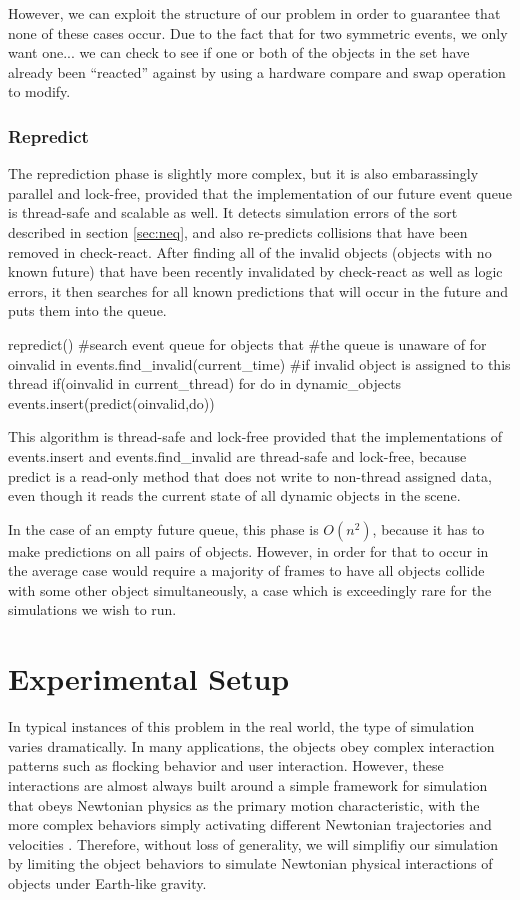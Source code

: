 \documentclass[conference]{IEEEtran}
\begin{document}
However, we can exploit the structure of our problem in order to guarantee that none of these cases occur.  Due to the fact that for two symmetric events, we only want one... we can check to see if one or both of the objects in the set have already been ``reacted'' against by using a hardware compare and swap operation to modify.

\subsubsection{Repredict}
The reprediction phase is slightly more complex, but it is also embarassingly parallel and lock-free, provided that the implementation of our future event queue is thread-safe and scalable as well.  It detects simulation errors of the sort described in section \ref{sec:neq}, and also re-predicts collisions
that have been removed in check-react.  After finding all of the invalid objects (objects with no known future) that have been recently invalidated by check-react as well as logic errors, it then
searches for all known predictions that will occur in the future and puts them into the queue.  
\begin{verbatimtab}[3]
repredict()
{
   #search event queue for objects that
   #the queue is unaware of
   for oinvalid in events.find_invalid(current_time)
   {
        #if invalid object is assigned to this thread
        if(oinvalid in current_thread)
        {
		for do in dynamic_objects
		{
			events.insert(predict(oinvalid,do))
		}
	}
   }
}
\end{verbatimtab}
This algorithm is thread-safe and lock-free provided that the implementations of events.insert and events.find\_invalid are thread-safe and lock-free, because predict is a read-only method that 
does not write to non-thread assigned data, even though it reads the current state of all dynamic objects in the scene.

In the case of an empty future queue, this phase is $O(n^2)$, because it has to make predictions on all pairs of objects.  However, in order for that to occur in the average case would require a majority of frames to have all objects collide
with some other object simultaneously, a case which is exceedingly rare for the simulations we wish to run.

\section{Experimental Setup}%

In typical instances of this problem in the real world, the type of simulation varies dramatically. In many applications, the objects obey complex interaction patterns such as flocking behavior and user interaction.  However, these interactions are almost always built around a simple framework for simulation that obeys Newtonian physics as the primary motion characteristic, with the more complex
behaviors simply activating different Newtonian trajectories and velocities \cite{Jadbabaie02coordinationof}.  Therefore, without loss of generality, we will simplifiy our simulation by limiting the object behaviors to simulate Newtonian physical interactions of objects under Earth-like gravity.
\end{document}
